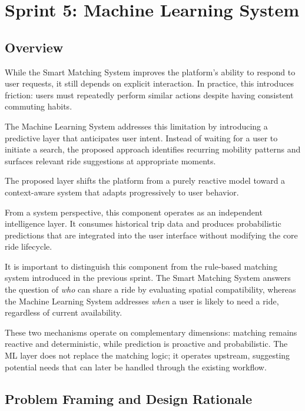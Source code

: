 \section{Sprint 5: Machine Learning System}

\subsection{Overview}

While the Smart Matching System improves the platform’s ability to respond to user requests, it still depends on explicit interaction. In practice, this introduces friction: users must repeatedly perform similar actions despite having consistent commuting habits.

The Machine Learning System addresses this limitation by introducing a predictive layer that anticipates user intent. Instead of waiting for a user to initiate a search, the proposed approach identifies recurring mobility patterns and surfaces relevant ride suggestions at appropriate moments.

The proposed layer shifts the platform from a purely reactive model toward a context-aware system that adapts progressively to user behavior.

From a system perspective, this component operates as an independent intelligence layer. It consumes historical trip data and produces probabilistic predictions that are integrated into the user interface without modifying the core ride lifecycle.

It is important to distinguish this component from the rule-based matching system introduced in the previous sprint. The Smart Matching System answers the question of \textit{who} can share a ride by evaluating spatial compatibility, whereas the Machine Learning System addresses \textit{when} a user is likely to need a ride, regardless of current availability.

These two mechanisms operate on complementary dimensions: matching remains reactive and deterministic, while prediction is proactive and probabilistic. The ML layer does not replace the matching logic; it operates upstream, suggesting potential needs that can later be handled through the existing workflow.

\subsection{Problem Framing and Design Rationale}

